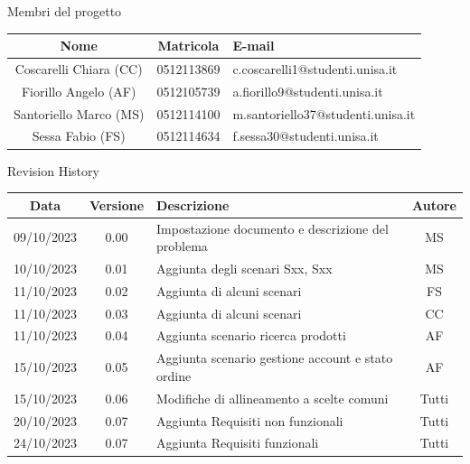 \documentclass[12pt, a4paper, oneside]{book}
\begin{document}
    \newpage
    \begin{center}
    {\LARGE{Membri del progetto}}
    \end{center}
    \begin{center}
        \begin{tabular}{|c|c|m{8cm}|}
            \hline
            \cellcolor{lightgray} \textbf{Nome} & \cellcolor{lightgray} \textbf{Matricola} & \cellcolor{lightgray} \textbf{E-mail}\\ \hline
            Coscarelli Chiara (CC) & 0512113869 & c.coscarelli1@studenti.unisa.it\\ \hline
            Fiorillo Angelo (AF) & 0512105739 & a.fiorillo9@studenti.unisa.it\\ \hline
            Santoriello Marco (MS) &  0512114100 & m.santoriello37@studenti.unisa.it\\ \hline
            Sessa Fabio (FS) & 0512114634 & f.sessa30@studenti.unisa.it\\ \hline
        \end{tabular}
    \end{center}

    \begin{center}
    {\LARGE{Revision History}}
    \end{center}

    \begin{center}
        \begin{tabular}{|c|c|m{8cm}|c|}
            \hline
            \cellcolor{lightgray} \textbf{Data} & \cellcolor{lightgray} \textbf{Versione} & \cellcolor{lightgray} \textbf{Descrizione} & \cellcolor{lightgray} \textbf{Autore}\\ \hline
            09/10/2023 & 0.00 & Impostazione documento e descrizione del problema & MS\\ \hline
            10/10/2023 & 0.01 & Aggiunta degli scenari Sxx, Sxx & MS\\ \hline
            11/10/2023 & 0.02 & Aggiunta di alcuni scenari & FS\\ \hline
            11/10/2023 & 0.03 & Aggiunta di alcuni scenari & CC\\ \hline
            11/10/2023 & 0.04 & Aggiunta scenario ricerca prodotti & AF\\ \hline
            15/10/2023 & 0.05 & Aggiunta scenario gestione account e stato ordine & AF\\ \hline
            15/10/2023 & 0.06 & Modifiche di allineamento a scelte comuni & Tutti\\ \hline
            20/10/2023 & 0.07 & Aggiunta Requisiti non funzionali & Tutti\\ \hline
            24/10/2023 & 0.07 & Aggiunta Requisiti funzionali & Tutti\\ \hline
        \end{tabular}
    \end{center}
\end{document}
